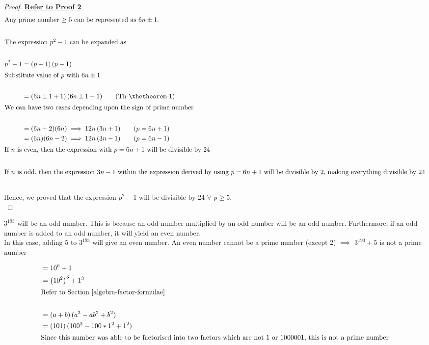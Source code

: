 \begin{proof}
    \textbf{\href{https://www.enjoymathematics.com/blog/prove-that-p-2-1-is-divisible-by-24}{Refer to Proof 2}}
    \begin{align*}
        \shortintertext{Any prime number $\geq$ 5 can be represented as $6n \pm 1$. } \\
        \shortintertext{The expression $p^2 - 1$ can be expanded as} \\
        p^2 - 1 &= (p + 1) \, (p-1) \\
        \shortintertext{Substitute value of $p$ with $6n \pm 1$} \\
        &= (6n \pm 1 + 1) \, (6n \pm 1 - 1) \tag{Th-\thetheorem-1} \\
        \shortintertext{We can have two cases depending upon the sign of prime number} \\
        &= (6n + 2) (6n) \implies 12n \,(3n + 1) \tag{$p=6n + 1$} \\
        &= (6n) (6n - 2) \implies 12n \,(3n - 1) \tag{$p=6n - 1$} \\
        \shortintertext{If $n$ is even, then the expression with $p=6n + 1$ will be divisible by 24} \\
        \shortintertext{If $n$ is odd, then the expression $3n-1$ within the expression derived by using $p=6n + 1$ will be divisible by 2, making everything divisible by 24} \\
    \end{align*}
    Hence, we proved that the expression $p^2 - 1$ will be divisible by 24 $\forall$ $p \geq 5$. \\
    
\end{proof}


$3^{193}$ will be an odd number. This is because an odd number multiplied by an odd number will be an odd number. Furthermore, if an odd number is added to an odd number, it will yield an even number. \\

In this case, adding $5$ to $3^{193}$ will give an even number. An even number cannot be a prime number (except 2) $\implies$ $3^{193} + 5$ is not a prime number

\begin{align*}
    &= 10^6 + 1 \\
    &= \displaystyle{\left ( 10^2 \right ) ^3 } + 1^3 \\
    \shortintertext{Refer to Section \ref{algebra-factor-formulae}} \\
    &= (a + b) \, (a^2 - ab^2 + b^2) \\
    &= (101) \, (100^2 - 100 * 1^2 + 1^2) \\
    \shortintertext{Since this number was able to be factorised into two factors which are not $1$ or $1000001$, this is not a prime number}
\end{align*}

